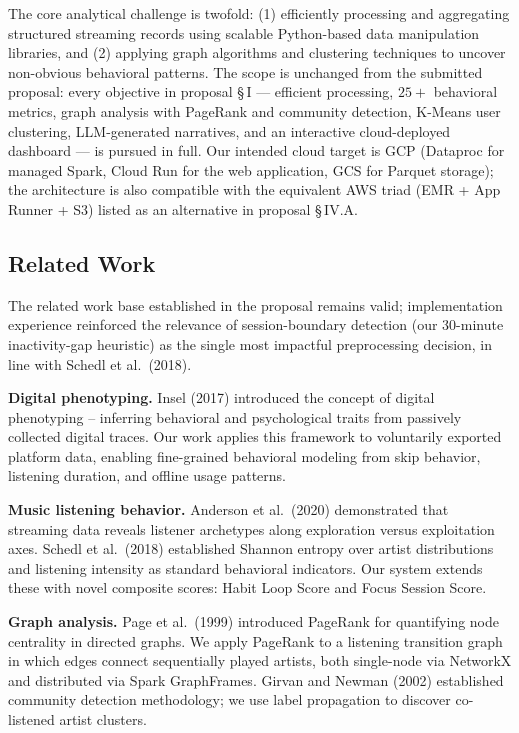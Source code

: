 \documentclass[conference]{IEEEtran}
\begin{document}
The core analytical challenge is twofold: (1) efficiently processing and aggregating structured streaming records using scalable Python-based data manipulation libraries, and (2) applying graph algorithms and clustering techniques to uncover non-obvious behavioral patterns. The scope is unchanged from the submitted proposal: every objective in proposal \S\,I --- efficient processing, $25{+}$ behavioral metrics, graph analysis with PageRank and community detection, K-Means user clustering, LLM-generated narratives, and an interactive cloud-deployed dashboard --- is pursued in full. Our intended cloud target is GCP (Dataproc for managed Spark, Cloud Run for the web application, GCS for Parquet storage); the architecture is also compatible with the equivalent AWS triad (EMR + App Runner + S3) listed as an alternative in proposal \S\,IV.A.

\subsection{Related Work}

The related work base established in the proposal remains valid; implementation experience reinforced the relevance of session-boundary detection (our 30-minute inactivity-gap heuristic) as the single most impactful preprocessing decision, in line with Schedl et al.\ (2018).

\textbf{Digital phenotyping.} Insel (2017) \cite{insel2017} introduced the concept of digital phenotyping -- inferring behavioral and psychological traits from passively collected digital traces. Our work applies this framework to voluntarily exported platform data, enabling fine-grained behavioral modeling from skip behavior, listening duration, and offline usage patterns.

\textbf{Music listening behavior.} Anderson et al.\ (2020) \cite{anderson2020} demonstrated that streaming data reveals listener archetypes along exploration versus exploitation axes. Schedl et al.\ (2018) \cite{schedl2018} established Shannon entropy over artist distributions and listening intensity as standard behavioral indicators. Our system extends these with novel composite scores: Habit Loop Score and Focus Session Score.

\textbf{Graph analysis.} Page et al.\ (1999) \cite{page1999} introduced PageRank for quantifying node centrality in directed graphs. We apply PageRank to a listening transition graph in which edges connect sequentially played artists, both single-node via NetworkX and distributed via Spark GraphFrames. Girvan and Newman (2002) \cite{girvan2002} established community detection methodology; we use label propagation to discover co-listened artist clusters.
\end{document}
